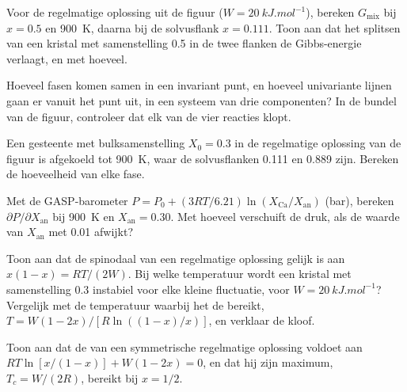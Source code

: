 \begin{exercise}[$\star\star$]\label{exo:b3:petrological-thermodynamics:6}
Voor de regelmatige oplossing uit de figuur ($W = \qty{20}{kJ.mol^{-1}}$), bereken
$G_{\text{mix}}$ bij $x = 0.5$ en \qty{900}{K}, daarna bij de solvusflank $x =
0.111$. Toon aan dat het splitsen van een kristal met samenstelling 0.5 in de twee flanken
de Gibbs-energie verlaagt, en met hoeveel.
\end{exercise}

\begin{exercise}[$\star\star$]\label{exo:b3:petrological-thermodynamics:7}
Hoeveel fasen komen samen in een invariant punt, en hoeveel univariante lijnen
gaan er vanuit het punt uit, in een systeem van drie componenten? In de bundel van de
figuur, controleer dat elk van de vier reacties klopt.
\end{exercise}

\begin{exercise}[$\star\star$]\label{exo:b3:petrological-thermodynamics:8}
Een gesteente met bulksamenstelling $X_0 = 0.3$ in de regelmatige oplossing van de figuur
is afgekoeld tot \qty{900}{K}, waar de solvusflanken 0.111 en 0.889 zijn.
Bereken de hoeveelheid van elke fase.
\end{exercise}

\begin{exercise}[$\star\star$]\label{exo:b3:petrological-thermodynamics:9}
Met de GASP-barometer $P = P_0 + (3RT/6.21)\ln(X_{\text{Ca}}/X_{\text{an}})$
(bar), bereken $\partial P/\partial X_{\text{an}}$ bij \qty{900}{K} en
$X_{\text{an}} = 0.30$. Met hoeveel verschuift de druk, als de waarde van
$X_{\text{an}}$ met 0.01 afwijkt?
\end{exercise}

\begin{exercise}[$\star\star\star$]\label{exo:b3:petrological-thermodynamics:10}
Toon aan dat de spinodaal van een regelmatige oplossing gelijk is aan $x(1 - x) = RT/(2W)$. Bij welke
temperatuur wordt een kristal met samenstelling 0.3 instabiel voor elke kleine
fluctuatie, voor $W = \qty{20}{kJ.mol^{-1}}$? Vergelijk met de temperatuur waarbij
het de  bereikt, $T = W(1 - 2x)/[R\ln((1 - x)/x)]$, en verklaar
de kloof.
\end{exercise}

\begin{exercise}[$\star\star\star$]\label{exo:b3:petrological-thermodynamics:11}
Toon aan dat de  van een symmetrische regelmatige oplossing voldoet aan $RT\ln[x/(1 -
x)] + W(1 - 2x) = 0$, en dat hij zijn maximum, $T_c = W/(2R)$, bereikt bij $x
= 1/2$.
\end{exercise}

